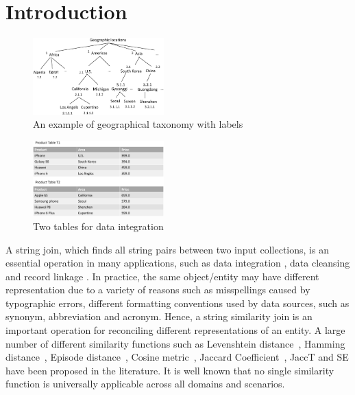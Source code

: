 \section{Introduction}

\begin{figure}[t]
\centering
\includegraphics[width=0.45\textwidth]{figures/taxonomylabels}
 \caption{An example of geographical taxonomy with labels}
\label{fig:taxonomyexample}
\end{figure}


\begin{figure}[t]
\centering
\includegraphics[width=0.45\textwidth]{figures/productexample}
 \caption{Two tables for data integration}
\label{fig:twotables}
\end{figure}


A string join, which finds all string pairs between two input collections, is an essential operation in many applications, such as  data integration \cite{conf/sigmod/Sarawagi04}, data cleansing \cite{conf/vldb/ArasuGK06,journals/www/LiJM06} and record linkage \cite{books/Winkler99}. In practice, the same object/entity may have different representation  due to a variety of reasons such as misspellings
caused by typographic errors, different formatting conventions
used by data sources, such as synonym, abbreviation and acronym. Hence, a string similarity join is an important operation for reconciling different
representations of an entity. A large number of different similarity functions such as Levenshtein distance~\cite{conf/sigmod/WangLF12},
Hamming distance~\cite{conf/spire/Kondrak05}, Episode
distance~\cite{conf/ijcai/CohenRF03}, Cosine
metric~\cite{journals/ipm/SaltonB88}, Jaccard
Coefficient~\cite{conf/icde/ChaudhuriGK06,conf/icde/LiLL08}, JaccT \cite{conf/icde/ArasuCK08} and SE \cite{conf/sigmod/LuLWLW13} have been proposed in the literature. It is well known
that no single similarity function is universally applicable
across all domains and scenarios.


